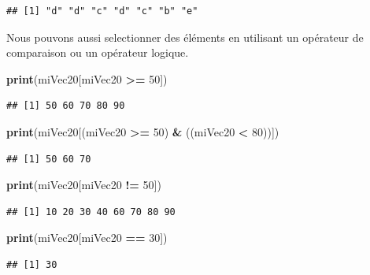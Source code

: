 \documentclass[]{book}
\newenvironment{Shaded}{\begin{snugshade}}{\end{snugshade}}
\newcommand{\DecValTok}[1]{\textcolor[rgb]{0.00,0.00,0.81}{#1}}
\newcommand{\KeywordTok}[1]{\textcolor[rgb]{0.13,0.29,0.53}{\textbf{#1}}}
\newcommand{\NormalTok}[1]{#1}
\newcommand{\OperatorTok}[1]{\textcolor[rgb]{0.81,0.36,0.00}{\textbf{#1}}}
\newcommand{\StringTok}[1]{\textcolor[rgb]{0.31,0.60,0.02}{#1}}
\begin{document}
\begin{verbatim}
## [1] "d" "d" "c" "d" "c" "b" "e"
\end{verbatim}

Nous pouvons aussi selectionner des éléments en utilisant un opérateur de comparaison ou un opérateur logique.

\begin{Shaded}
\begin{Highlighting}[]
\KeywordTok{print}\NormalTok{(miVec20[miVec20 }\OperatorTok{>=}\StringTok{ }\DecValTok{50}\NormalTok{])}
\end{Highlighting}
\end{Shaded}

\begin{verbatim}
## [1] 50 60 70 80 90
\end{verbatim}

\begin{Shaded}
\begin{Highlighting}[]
\KeywordTok{print}\NormalTok{(miVec20[(miVec20 }\OperatorTok{>=}\StringTok{ }\DecValTok{50}\NormalTok{) }\OperatorTok{&}\StringTok{ }\NormalTok{((miVec20 }\OperatorTok{<}\StringTok{ }\DecValTok{80}\NormalTok{))])}
\end{Highlighting}
\end{Shaded}

\begin{verbatim}
## [1] 50 60 70
\end{verbatim}

\begin{Shaded}
\begin{Highlighting}[]
\KeywordTok{print}\NormalTok{(miVec20[miVec20 }\OperatorTok{!=}\StringTok{ }\DecValTok{50}\NormalTok{])}
\end{Highlighting}
\end{Shaded}

\begin{verbatim}
## [1] 10 20 30 40 60 70 80 90
\end{verbatim}

\begin{Shaded}
\begin{Highlighting}[]
\KeywordTok{print}\NormalTok{(miVec20[miVec20 }\OperatorTok{==}\StringTok{ }\DecValTok{30}\NormalTok{])}
\end{Highlighting}
\end{Shaded}

\begin{verbatim}
## [1] 30
\end{verbatim}
\end{document}
